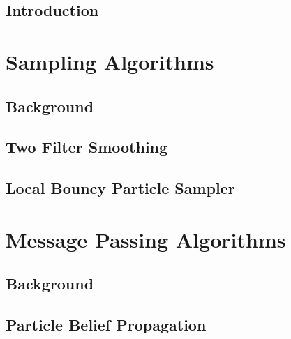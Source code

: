 \doublespacing
\flushbottom

\chapter{Introduction}\setcounter{page}{1}

\ifintro\fi

\part{Sampling Algorithms} %

\chapter{Background}

\ifbgs\fi

\chapter{Two Filter Smoothing}

\iftfs\fi

\chapter{Local Bouncy Particle Sampler}

\iflbps\fi

\part{Message Passing Algorithms} %

\chapter{Background}

\ifbgm\fi

\chapter{Particle Belief Propagation}

